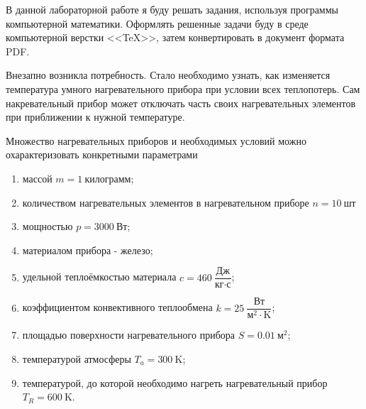 \documentclass[a4paper, 14pt, titlepage, fleqn]{extarticle}
\begin{document}
	\tableofcontents
	\newpage

    \onehalfspacing
    

        В данной лабораторной работе я буду решать задания, используя программы компьютерной математики. 
        Оформлять решенные задачи буду в среде компьютерной верстки <<\TeX>>, затем конвертировать в документ формата PDF.
        

            Внезапно возникла потребность. 
            Стало необходимо узнать, как изменяется температура умного нагревательного прибора при условии всех теплопотерь. 
            Сам накревательный прибор может отключать часть своих нагревательных элементов при приближении к нужной температуре.
        
            Множество нагревательных приборов и необходимых условий можно охарактеризовать конкретными параметрами
            
            \begin{enumerate}
                \item массой $m = 1 \ \text{килограмм}$;
                \item количеством нагревательных элементов в нагревательном приборе $n = 10 \ \text{шт}$
                \item мощностью $p = 3000 \ \text{Вт}$;
                \item материалом прибора - железо;
                \item удельной теплоёмкостью материала $c = 460 \ \dfrac{\text{Дж}}{\text{кг} \cdot \text{с}}$;
                \item коэффициентом конвективного теплообмена $k = 25 \ \dfrac{\text{Вт}}{\text{м}^2 \cdot \text{K}}$;
                \item площадью поверхности нагревательного прибора $S = 0.01 \ \text{м}^2$;
                \item температурой атмосферы $T_a = 300 \ \text{K}$;
                \item температурой, до которой необходимо нагреть нагревательный прибор $T_R = 600 \ \text{K}$.
            \end{enumerate}
\end{document}
